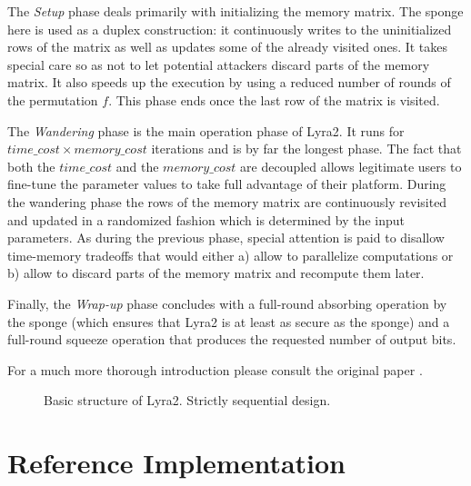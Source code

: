 The \emph{Setup} phase deals primarily with initializing the memory matrix. The sponge here is used as a duplex construction: it continuously writes to the uninitialized rows of the matrix as well as updates some of the already visited ones. It takes special care so as not to let potential attackers discard parts of the memory matrix. It also speeds up the execution by using a reduced number of rounds of the permutation \(f\). This phase ends once the last row of the matrix is visited.

The \emph{Wandering} phase is the main operation phase of Lyra2. It runs for \(time\_cost \times memory\_cost\) iterations and is by far the longest phase. The fact that both the \(time\_cost\) and the \(memory\_cost\) are decoupled allows legitimate users to fine-tune the parameter values to take full advantage of their platform. During the wandering phase the rows of the memory matrix are continuously revisited and updated in a randomized fashion which is determined by the input parameters. As during the previous phase, special attention is paid to disallow time-memory tradeoffs that would either a) allow to parallelize computations or b) allow to discard parts of the memory matrix and recompute them later.

Finally, the \emph{Wrap-up} phase concludes with a full-round absorbing operation by the sponge (which ensures that Lyra2 is at least as secure as the sponge) and a full-round squeeze operation that produces the requested number of output bits.

For a much more thorough introduction please consult the original paper \cite{andrade:2016:lyra2,marcos:2015:lyra2}.

\begin{figure}[H]
\centering
  \caption{Basic structure of Lyra2. Strictly sequential design.}
  \label{fig:basic-structure-lyra2}
\end{figure}

\section{Reference Implementation}
\label{sec:reference-implementation}

